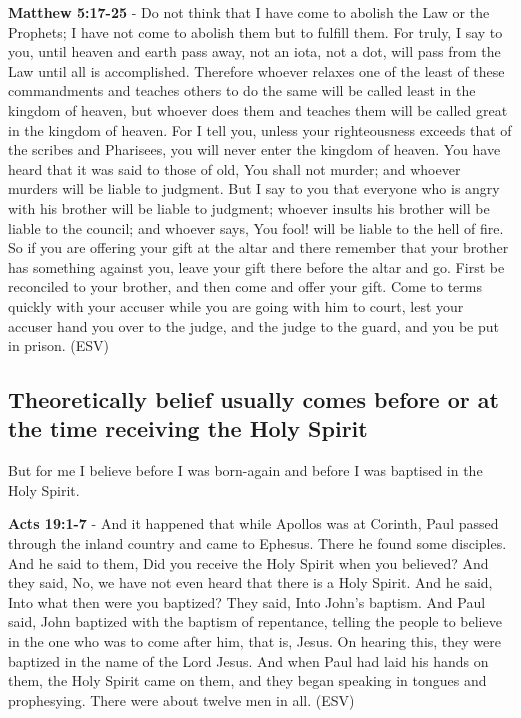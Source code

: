 \documentclass[11pt]{article}
\begin{document}
\textbf{Matthew 5:17-25} - Do not think that I have come to abolish the Law or the Prophets; I have not come to abolish them but to fulfill them. For truly, I say to you, until heaven and earth pass away, not an iota, not a dot, will pass from the Law until all is accomplished. Therefore whoever relaxes one of the least of these commandments and teaches others to do the same will be called least in the kingdom of heaven, but whoever does them and teaches them will be called great in the kingdom of heaven. For I tell you, unless your righteousness exceeds that of the scribes and Pharisees, you will never enter the kingdom of heaven. You have heard that it was said to those of old, You shall not murder; and whoever murders will be liable to judgment. But I say to you that everyone who is angry with his brother will be liable to judgment; whoever insults his brother will be liable to the council; and whoever says, You fool! will be liable to the hell of fire. So if you are offering your gift at the altar and there remember that your brother has something against you, leave your gift there before the altar and go. First be reconciled to your brother, and then come and offer your gift. Come to terms quickly with your accuser while you are going with him to court, lest your accuser hand you over to the judge, and the judge to the guard, and you be put in prison. (ESV)

\subsection{Theoretically belief usually comes before or at the time receiving the Holy Spirit}
\label{sec:org2ef6533}
But for me I believe before I was born-again and before I was baptised in the Holy Spirit.

\textbf{Acts 19:1-7} - And it happened that while Apollos was at Corinth, Paul passed through the inland country and came to Ephesus. There he found some disciples. And he said to them, Did you receive the Holy Spirit when you believed? And they said, No, we have not even heard that there is a Holy Spirit. And he said, Into what then were you baptized? They said, Into John's baptism. And Paul said, John baptized with the baptism of repentance, telling the people to believe in the one who was to come after him, that is, Jesus. On hearing this, they were baptized in the name of the Lord Jesus. And when Paul had laid his hands on them, the Holy Spirit came on them, and they began speaking in tongues and prophesying. There were about twelve men in all. (ESV)
\end{document}

